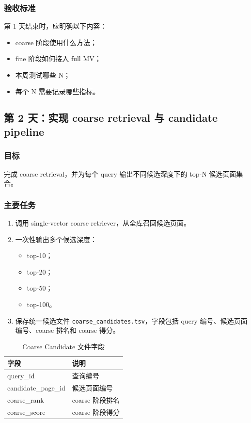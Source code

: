 \documentclass[UTF8,a4paper,12pt]{ctexart}
\begin{document}
	\subsubsection*{验收标准}
	
	第 1 天结束时，应明确以下内容：
	
	\begin{itemize}[leftmargin=2em]
		\item coarse 阶段使用什么方法；
		\item fine 阶段如何接入 full MV；
		\item 本周测试哪些 N；
		\item 每个 N 需要记录哪些指标。
	\end{itemize}
	
	\subsection{第 2 天：实现 coarse retrieval 与 candidate pipeline}
	
	\subsubsection*{目标}
	
	完成 coarse retrieval，并为每个 query 输出不同候选深度下的 top-N 候选页面集合。
	
	\subsubsection*{主要任务}
	
	\begin{enumerate}[leftmargin=2em]
		\item 调用 single-vector coarse retriever，从全库召回候选页面。
		\item 一次性输出多个候选深度：
		\begin{itemize}
			\item top-10；
			\item top-20；
			\item top-50；
			\item top-100。
		\end{itemize}
		\item 保存统一候选文件 \texttt{coarse\_candidates.tsv}，字段包括 query 编号、候选页面编号、coarse 排名和 coarse 得分。
	\end{enumerate}
	
	\begin{table}[H]
		\centering
		\caption{Coarse Candidate 文件字段}
		\begin{tabular}{p{5cm}p{8cm}}
			\toprule
			\textbf{字段} & \textbf{说明} \\
			\midrule
			query\_id & 查询编号 \\
			candidate\_page\_id & 候选页面编号 \\
			coarse\_rank & coarse 阶段排名 \\
			coarse\_score & coarse 阶段得分 \\
			\bottomrule
		\end{tabular}
	\end{table}
	
\end{document}
